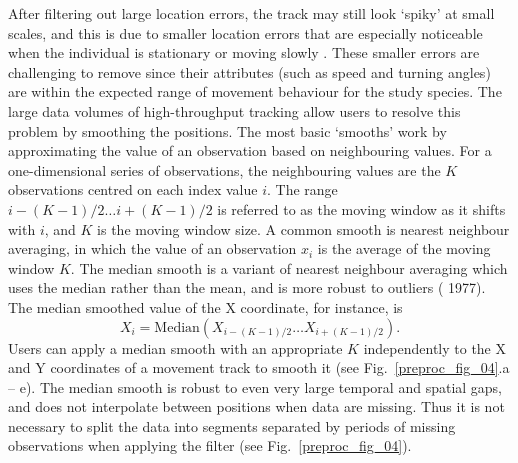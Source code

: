     After filtering out large location errors, the track may still look `spiky' at small scales, and this is due to smaller location errors that are especially noticeable when the individual is stationary or moving slowly \citep{noonan2019}.
    These smaller errors are challenging to remove since their attributes (such as speed and turning angles) are within the expected range of movement behaviour for the study species. 
    The large data volumes of high-throughput tracking allow users to resolve this problem by smoothing the positions. 
    The most basic `smooths' work by approximating the value of an observation based on neighbouring values.
    For a one-dimensional series of observations, the neighbouring values are the $K$ observations centred on each index value $i$.
    The range ${i - (K-1)/2} \ldots {i + (K-1)/2}$ is referred to as the moving window as it shifts with $i$, and $K$ is the moving window size.
    A common smooth is nearest neighbour averaging, in which the value of an observation $x_i$ is the average of the moving window $K$.
    The median smooth is a variant of nearest neighbour averaging which uses the median rather than the mean, and is more robust to outliers (\citeauthor{tukey1977} 1977).
    The median smoothed value of the X coordinate, for instance, is
        $$
            X_i = \text{Median}(X_{i - (K-1)/2} \ldots X_{i + (K-1)/2}).
        $$
    Users can apply a median smooth with an appropriate $K$ independently to the X and Y coordinates of a movement track to smooth it (see Fig.~\ref{preproc_fig_04}.a -- e).
    The median smooth is robust to even very large temporal and spatial gaps, and does not interpolate between positions when data are missing. 
    Thus it is not necessary to split the data into segments separated by periods of missing observations when applying the filter (see Fig.~\ref{preproc_fig_04}).

